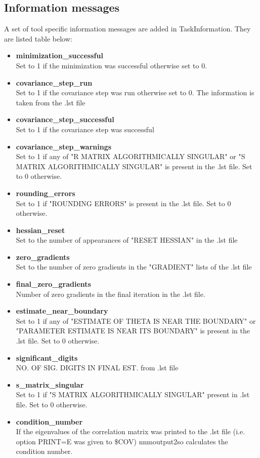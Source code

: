 \subsection{Information messages}
A set of tool specific information messages are added in TaskInformation. They are listed table below:

\begin{itemize}
    \item \textbf{minimization\_successful} \\ Set to 1 if the minimization was successful otherwise set to 0.
    \item \textbf{covariance\_step\_run} \\ Set to 1 if the covariance step was run otherwise set to 0. The information is taken from the .lst file
    \item \textbf{covariance\_step\_successful} \\ Set to 1 if the covariance step was successful
    \item \textbf{covariance\_step\_warnings} \\ Set to 1 if any of "R MATRIX ALGORITHMICALLY SINGULAR" or "S MATRIX ALGORITHMICALLY SINGULAR" is present in the .lst file. Set to 0 otherwise.
    \item \textbf{rounding\_errors} \\ Set to 1 if "ROUNDING ERRORS" is present in the .lst file.  Set to 0 otherwise.
    \item \textbf{hessian\_reset} \\ Set to the number of appearances of "RESET HESSIAN" in the .lst file
    \item \textbf{zero\_gradients} \\ Set to the number of zero gradients in the "GRADIENT" lists of the .lst file
    \item \textbf{final\_zero\_gradients} \\ Number of zero gradients in the final iteration in the .lst file.
    \item \textbf{estimate\_near\_boundary} \\ Set to 1 if any of "ESTIMATE OF THETA IS NEAR THE BOUNDARY" or "PARAMETER ESTIMATE IS NEAR ITS BOUNDARY" is present in the .lst file. Set to 0 otherwise.
    \item \textbf{significant\_digits} \\ NO. OF SIG. DIGITS IN FINAL EST. from .lst file
    \item \textbf{s\_matrix\_singular} \\ Set to 1 if "S MATRIX ALGORITHMICALLY SINGULAR" present in .lst file. Set to 0 otherwise.
    \item \textbf{condition\_number} \\ If the eigenvalues of the correlation matrix was printed to the .lst file (i.e. option PRINT=E was given to \$COV) nnmoutput2so calculates the condition number. 
\end{itemize}



